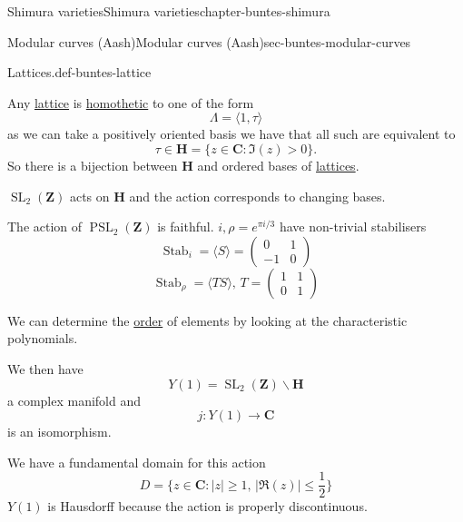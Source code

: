 \documentclass[oneside,10pt,]{book}
\numberwithin{equation}{section}
\newcommand{\ZZ}{\mathbf{Z}}
\newcommand{\CC}{\mathbf{C}}
\newcommand{\HH}{\mathbf{H}}
\DeclareMathOperator{\Stab}{Stab}
\DeclareMathOperator{\SL}{SL}
\DeclareMathOperator{\PSL}{PSL}
\newcommand{\gt}{>}
\newcommand{\amp}{&}
\begin{document}
\begin{chapterptx}{Shimura varieties}{}{Shimura varieties}{}{}{chapter-buntes-shimura}
\begin{sectionptx}{Modular curves (Aash)}{}{Modular curves (Aash)}{}{}{sec-buntes-modular-curves}
\begin{definition}{Lattices.}{def-buntes-lattice}
\end{definition}
\hypertarget{p-1023}{}%
Any \hyperref[def-buntes-lattice]{lattice} is \hyperref[def-buntes-lattice]{homothetic} to one of the form%
\begin{equation*}
\Lambda = \langle 1 , \tau \rangle
\end{equation*}
as we can take a positively oriented basis we have that all such are equivalent to%
\begin{equation*}
\tau \in \HH = \{ z\in \CC: \Im(z) \gt 0 \}\text{.}
\end{equation*}
So there is a bijection between \(\HH\) and ordered bases of \hyperref[def-buntes-lattice]{lattices}.%
\par
\hypertarget{p-1024}{}%
\(\SL_2(\ZZ)\) acts on \(\HH\) and the action corresponds to changing bases.%
\par
\hypertarget{p-1025}{}%
The action of \(\PSL_2(\ZZ)\) is faithful. \(i,\rho = e^{\pi i /3}\) have non-trivial stabilisers%
\begin{equation*}
\Stab_i =  \langle S\rangle = \begin{pmatrix} 0\amp1 \\ -1 \amp 0 \end{pmatrix}
\end{equation*}
%
\begin{equation*}
\Stab_\rho =  \langle TS\rangle,\,T = \begin{pmatrix} 1\amp1 \\ 0 \amp 1 \end{pmatrix}
\end{equation*}
%
\par
\hypertarget{p-1026}{}%
We can determine the \hyperref[def-order-quaternion]{order} of elements by looking at the characteristic polynomials.%
\par
\hypertarget{p-1027}{}%
We then have%
\begin{equation*}
Y(1) =\SL_2(\ZZ) \backslash \HH
\end{equation*}
a complex manifold and%
\begin{equation*}
j\colon Y(1) \to \CC
\end{equation*}
is an isomorphism.%
\par
\hypertarget{p-1028}{}%
We have a fundamental domain for this action%
\begin{equation*}
D = \{ z\in \CC : |z|  \ge 1,\, |\Re(z)| \le \frac 12 \}
\end{equation*}
\(Y(1)\) is Hausdorff because the action is properly discontinuous.%
\par

\end{sectionptx}
\end{chapterptx}
\end{document}
